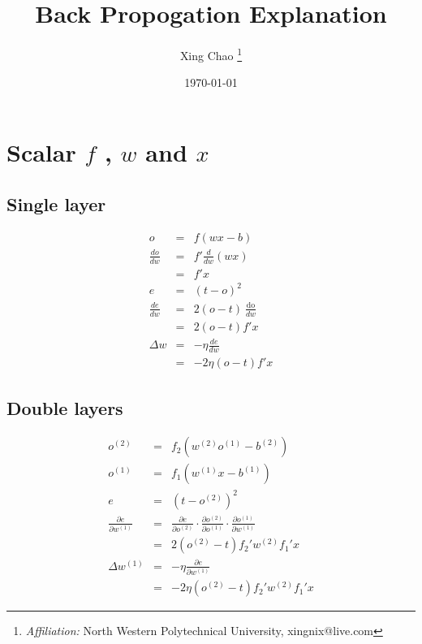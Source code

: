 \documentclass{article}
\newcommand{\cdummy}{\cdot}
\newcommand{\nosymbol}{}
\newcommand{\tmaffiliation}[1]{\thanks{\textit{Affiliation:} #1}}
\newcommand{\tmdate}[1]{\today}
\newcommand{\tmop}[1]{\ensuremath{\operatorname{#1}}}
\begin{document}
\title{Back Propogation Explanation}

\author{
  Xing Chao
  \tmaffiliation{North Western Polytechnical University, xingnix@live.com}
}

\date{\tmdate{}}

\maketitle

\section{Scalar $f$ , $w$ and $x$ }

\subsection{Single layer}

\begin{eqnarray*}
  o & = & f (wx-b)\\
  \frac{do}{dw} & = & f'  \frac{d}{dw}  (wx)\\
  & = & f' x\\
  e & = & (t-o)^{2}\\
  \frac{de}{dw} & = & 2 (o-t)  \frac{\tmop{do}}{dw}\\
  & = & 2 (o-t) f' x\\
  \Delta w & = & - \eta \frac{de}{dw}\\
  & = & -2 \eta (o-t) f' x
\end{eqnarray*}

\subsection{Double layers}

\begin{eqnarray*}
  o^{(2)} & = & f_{2}  (w^{(2)} o^{(1)} -b_{\nosymbol}^{(2)} )\\
  o^{(1)} & = & f_{1}  (w^{(1)} x-b^{(1)} )\\
  e & = & (t-o^{(2)} )^{2}\\
  \frac{\partial e}{\partial w^{(1)}} & = & \frac{\partial e}{\partial
  o^{(2)}} \cdummy \frac{\partial o^{(2)}}{\partial o^{(1)}} \cdummy
  \frac{\partial o^{(1)}}{\partial w^{(1)}}\\
  & = & 2 (o^{(2)} -t) f_{2}' w^{(2)} f_{1}' x\\
  \Delta w^{(1)} & = & - \eta \frac{\partial e}{\partial w^{(1)}}\\
  & = & -2 \eta (o^{(2)} -t) f_{2}' w^{(2)} f_{1}' x
\end{eqnarray*}
\end{document}

